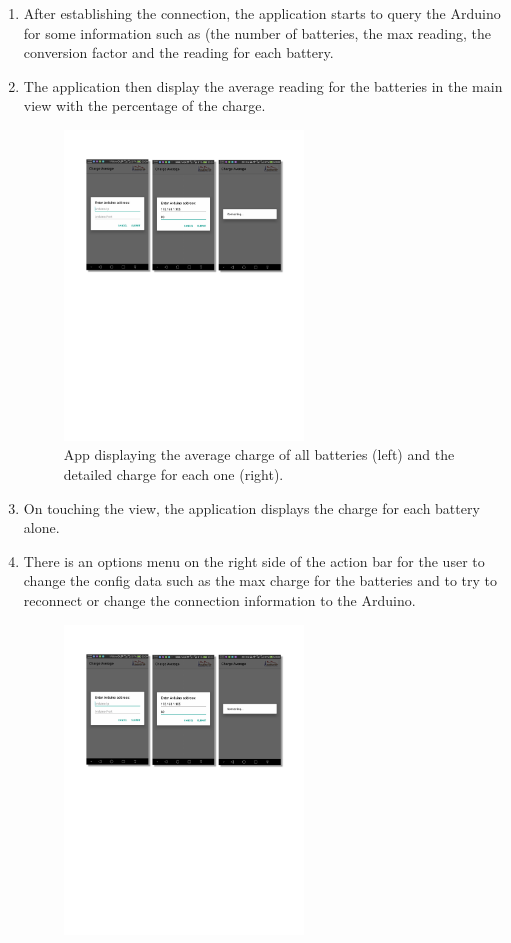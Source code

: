 \begin{enumerate}
    \item After establishing the connection, the application starts to query the Arduino for some information such as (the number of batteries, the max reading, the conversion factor and the reading for each battery.
    \item The application then display the average reading for the batteries in the main view with the percentage of the charge.
    \begin{figure}[h]
        \centering
        \includegraphics[width=0.6\textwidth,page=2]{figures/androidFigs}
        \caption{App displaying the average charge of all batteries (left) and the detailed charge for each one (right).}
        \label{fig:appCharge}
    \end{figure}
    \item On touching the view, the application displays the charge for each battery alone.
    \item There is an options menu on the right side of the action bar for the user to change the config data such as the max charge for the batteries and to try to reconnect or change the connection information to the Arduino.
    \begin{figure}[H]
        \centering
        \includegraphics[width=0.6\textwidth,page=3]{figures/androidFigs}

\end{figure}
\end{enumerate}
